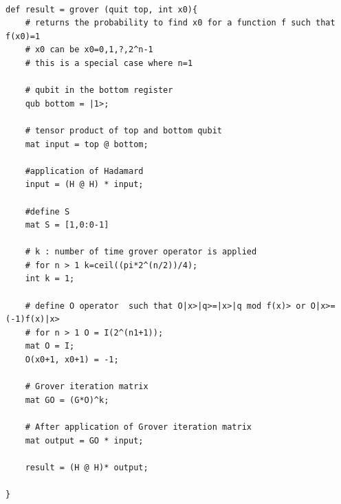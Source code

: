 \begin{lstlisting}

def result = grover (quit top, int x0){
	# returns the probability to find x0 for a function f such that f(x0)=1
	# x0 can be x0=0,1,?,2^n-1
	# this is a special case where n=1
	
	# qubit in the bottom register
	qub bottom = |1>;
	
	# tensor product of top and bottom qubit
	mat input = top @ bottom;
	
	#application of Hadamard
	input = (H @ H) * input;
	
	#define S
	mat S = [1,0:0-1]
	
	# k : number of time grover operator is applied
	# for n > 1 k=ceil((pi*2^(n/2))/4);
	int k = 1;
	
	# define O operator  such that O|x>|q>=|x>|q mod f(x)> or O|x>=(-1)f(x)|x> 
	# for n > 1 O = I(2^(n1+1));
	mat O = I;
	O(x0+1, x0+1) = -1;
	
	# Grover iteration matrix
	mat GO = (G*O)^k;
	
	# After application of Grover iteration matrix
	mat output = GO * input;
	
	result = (H @ H)* output;
	
}

\end{lstlisting}
